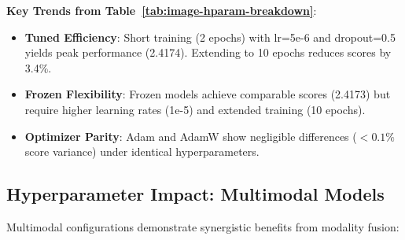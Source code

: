 \noindent \textbf{Key Trends from Table~\ref{tab:image-hparam-breakdown}}:
\newline

\begin{itemize}
    \item \textbf{Tuned Efficiency}: Short training (2 epochs) with lr=5e-6 and dropout=0.5 yields peak performance (2.4174). Extending to 10 epochs reduces scores by 3.4\%.
    \item \textbf{Frozen Flexibility}: Frozen models achieve comparable scores (2.4173) but require higher learning rates (1e-5) and extended training (10 epochs).
    \item \textbf{Optimizer Parity}: Adam and AdamW show negligible differences ($<0.1\%$ score variance) under identical hyperparameters.
\end{itemize}

\subsection{Hyperparameter Impact: Multimodal Models}
\label{subsec:multimodal-hparams}

Multimodal configurations demonstrate synergistic benefits from modality fusion:
\newline


